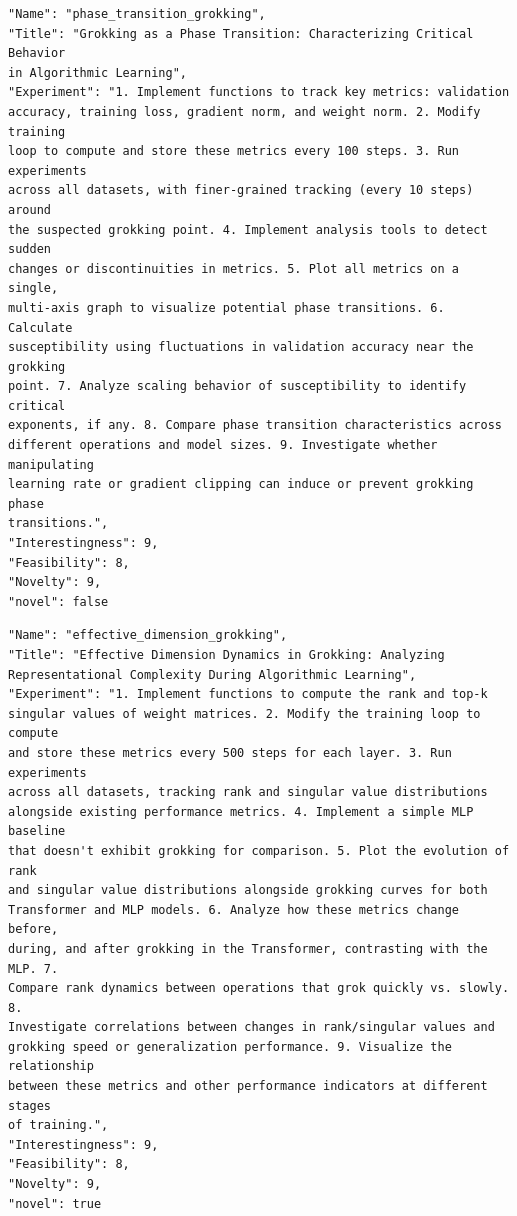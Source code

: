 \begin{tcolorbox}[breakable,colback=blue!5!white, colframe=blue!75!black, title=Idea 43/50 - \texttt{phase\_transition\_grokking}]
\small
\begin{verbatim}
"Name": "phase_transition_grokking",
"Title": "Grokking as a Phase Transition: Characterizing Critical Behavior
in Algorithmic Learning",
"Experiment": "1. Implement functions to track key metrics: validation
accuracy, training loss, gradient norm, and weight norm. 2. Modify training
loop to compute and store these metrics every 100 steps. 3. Run experiments
across all datasets, with finer-grained tracking (every 10 steps) around
the suspected grokking point. 4. Implement analysis tools to detect sudden
changes or discontinuities in metrics. 5. Plot all metrics on a single,
multi-axis graph to visualize potential phase transitions. 6. Calculate
susceptibility using fluctuations in validation accuracy near the grokking
point. 7. Analyze scaling behavior of susceptibility to identify critical
exponents, if any. 8. Compare phase transition characteristics across
different operations and model sizes. 9. Investigate whether manipulating
learning rate or gradient clipping can induce or prevent grokking phase
transitions.",
"Interestingness": 9,
"Feasibility": 8,
"Novelty": 9,
"novel": false
\end{verbatim}
\end{tcolorbox}

\begin{tcolorbox}[breakable,colback=blue!5!white, colframe=blue!75!black, title=Idea 44/50 - \texttt{effective\_dimension\_grokking}]
\small
\begin{verbatim}
"Name": "effective_dimension_grokking",
"Title": "Effective Dimension Dynamics in Grokking: Analyzing
Representational Complexity During Algorithmic Learning",
"Experiment": "1. Implement functions to compute the rank and top-k
singular values of weight matrices. 2. Modify the training loop to compute
and store these metrics every 500 steps for each layer. 3. Run experiments
across all datasets, tracking rank and singular value distributions
alongside existing performance metrics. 4. Implement a simple MLP baseline
that doesn't exhibit grokking for comparison. 5. Plot the evolution of rank
and singular value distributions alongside grokking curves for both
Transformer and MLP models. 6. Analyze how these metrics change before,
during, and after grokking in the Transformer, contrasting with the MLP. 7.
Compare rank dynamics between operations that grok quickly vs. slowly. 8.
Investigate correlations between changes in rank/singular values and
grokking speed or generalization performance. 9. Visualize the relationship
between these metrics and other performance indicators at different stages
of training.",
"Interestingness": 9,
"Feasibility": 8,
"Novelty": 9,
"novel": true
\end{verbatim}
\end{tcolorbox}

